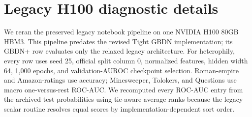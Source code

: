 \section{Legacy H100 diagnostic details}
\label{app:legacy-h100}

We reran the preserved legacy notebook pipeline on one NVIDIA H100 80GB HBM3.
This pipeline predates the revised Tight GBDN implementation; its GBDN+ row
evaluates only the relaxed legacy architecture.  For heterophily, every row
uses seed 25, official split column 0, normalized features, hidden width 64,
1,000 epochs, and validation-AUROC checkpoint selection.  Roman-empire and
Amazon-ratings use accuracy; Minesweeper, Tolokers, and Questions use macro
one-versus-rest ROC-AUC.  We recomputed every ROC-AUC entry from the archived
test probabilities using tie-aware average ranks because the legacy scalar
routine resolves equal scores by implementation-dependent sort order.

